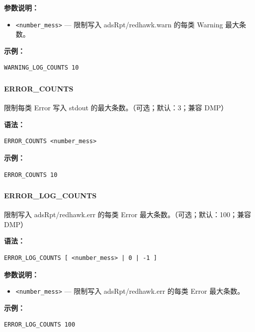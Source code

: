 \textbf{参数说明：}
\begin{itemize}
\item \texttt{<number\_mess>} — 限制写入 adsRpt/redhawk.warn 的每类 Warning 最大条数。
\end{itemize}

\textbf{示例：}
\begin{lstlisting}
WARNING_LOG_COUNTS 10
\end{lstlisting}

\subsubsection{}
\paragraph*{ERROR_COUNTS}

限制每类 Error 写入 stdout 的最大条数。（可选；默认：3；兼容 DMP）

\textbf{语法：}
\begin{lstlisting}
ERROR_COUNTS <number_mess>
\end{lstlisting}

\textbf{示例：}
\begin{lstlisting}
ERROR_COUNTS 10
\end{lstlisting}

\subsubsection{}
\paragraph*{ERROR_LOG_COUNTS}

限制写入 adsRpt/redhawk.err 的每类 Error 最大条数。（可选；默认：100；兼容 DMP）

\textbf{语法：}
\begin{lstlisting}
ERROR_LOG_COUNTS [ <number_mess> | 0 | -1 ]
\end{lstlisting}

\textbf{参数说明：}
\begin{itemize}
\item \texttt{<number\_mess>} — 限制写入 adsRpt/redhawk.err 的每类 Error 最大条数。
\end{itemize}

\textbf{示例：}
\begin{lstlisting}
ERROR_LOG_COUNTS 100
\end{lstlisting}

